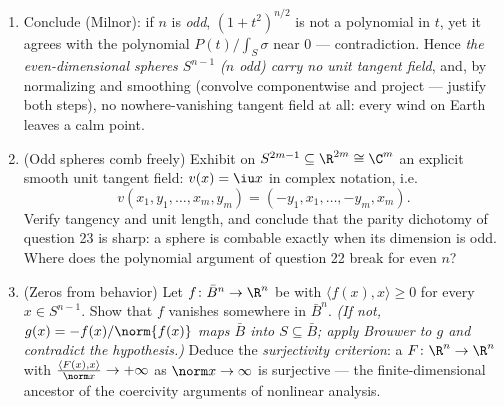 \begin{problem}
\begin{enumerate}[resume]
\[        \qquad\text{with the sign } + \text{ for small } t
        \]
        ( preserved by  from $t = 0$).
  \item Conclude (Milnor): if $n$ is \emph{odd}, $(1 +
        t^2)^{n/2}$ is not a polynomial in $t$, yet it
        agrees with the polynomial $P(t)/\int_S\sigma$ near
        $0$ --- contradiction. Hence \emph{the
        even-dimensional spheres $S^{n-1}$ ($n$ odd) carry
        no unit tangent field}, and, by normalizing and
        smoothing (convolve componentwise and project ---
        justify both steps), no  nowhere-vanishing
        tangent field at all: every wind on Earth leaves a
        calm point.

  \item (Odd spheres comb freely) Exhibit on $S^{2m-1}
        \subseteq \R^{2m} \cong \C^m$ an explicit smooth
        unit tangent field: $v(x) = \iu x$ in complex
        notation, i.e.
        \[
        v(x_1, y_1, \dots, x_m, y_m) =
        (-y_1, x_1, \dots, -y_m, x_m) .
        \]
        Verify tangency and unit length, and conclude that
        the parity dichotomy of question 23 is sharp: a
        sphere is combable exactly when its dimension is
        odd. Where does the polynomial argument of question
        22 break for even $n$?
  \item (Zeros from  behavior) Let $f \colon \bar
        B^n \to \R^n$ be  with $\langle f(x),
        x\rangle \geq 0$ for every $x \in S^{n-1}$. Show
        that $f$ vanishes somewhere in $\bar B^n$.
        \emph{(If not, $g(x) = -f(x)/\norm{f(x)}$ maps
        $\bar B$  into $S \subseteq \bar B$;
        apply Brouwer to $g$ and contradict the 
        hypothesis.)} Deduce the \emph{surjectivity
        criterion}: a  $F\colon\R^n\to\R^n$ with
        $\frac{\langle F(x), x\rangle}{\norm x} \to
        +\infty$ as $\norm x \to \infty$ is surjective ---
        the finite-dimensional ancestor of the coercivity
        arguments of nonlinear analysis.
\end{enumerate}
\end{problem}
